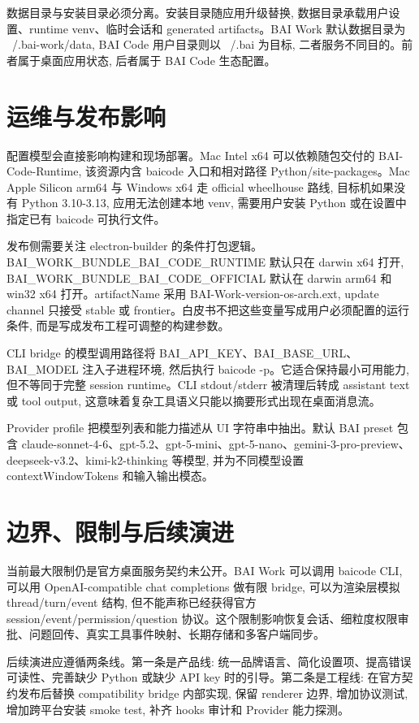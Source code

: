 数据目录与安装目录必须分离。安装目录随应用升级替换, 数据目录承载用户设置、runtime venv、临时会话和 generated artifacts。BAI Work 默认数据目录为 ~/.bai-work/data, BAI Code 用户目录则以 ~/.bai 为目标, 二者服务不同目的。前者属于桌面应用状态, 后者属于 BAI Code 生态配置。

\section{运维与发布影响}
配置模型会直接影响构建和现场部署。Mac Intel x64 可以依赖随包交付的 BAI-Code-Runtime, 该资源内含 baicode 入口和相对路径 Python/site-packages。Mac Apple Silicon arm64 与 Windows x64 走 official wheelhouse 路线, 目标机如果没有 Python 3.10-3.13, 应用无法创建本地 venv, 需要用户安装 Python 或在设置中指定已有 baicode 可执行文件。

发布侧需要关注 electron-builder 的条件打包逻辑。BAI\_WORK\_BUNDLE\_BAI\_CODE\_RUNTIME 默认只在 darwin x64 打开, BAI\_WORK\_BUNDLE\_BAI\_CODE\_OFFICIAL 默认在 darwin arm64 和 win32 x64 打开。artifactName 采用 BAI-Work-{version}-{os}-{arch}.{ext}, update channel 只接受 stable 或 frontier。白皮书不把这些变量写成用户必须配置的运行条件, 而是写成发布工程可调整的构建参数。

CLI bridge 的模型调用路径将 BAI\_API\_KEY、BAI\_BASE\_URL、BAI\_MODEL 注入子进程环境, 然后执行 baicode -p。它适合保持最小可用能力, 但不等同于完整 session runtime。CLI stdout/stderr 被清理后转成 assistant text 或 tool output, 这意味着复杂工具语义只能以摘要形式出现在桌面消息流。

Provider profile 把模型列表和能力描述从 UI 字符串中抽出。默认 BAI preset 包含 claude-sonnet-4-6、gpt-5.2、gpt-5-mini、gpt-5-nano、gemini-3-pro-preview、deepseek-v3.2、kimi-k2-thinking 等模型, 并为不同模型设置 contextWindowTokens 和输入输出模态。

\section{边界、限制与后续演进}
当前最大限制仍是官方桌面服务契约未公开。BAI Work 可以调用 baicode CLI, 可以用 OpenAI-compatible chat completions 做有限 bridge, 可以为渲染层模拟 thread/turn/event 结构, 但不能声称已经获得官方 session/event/permission/question 协议。这个限制影响恢复会话、细粒度权限审批、问题回传、真实工具事件映射、长期存储和多客户端同步。

后续演进应遵循两条线。第一条是产品线: 统一品牌语言、简化设置项、提高错误可读性、完善缺少 Python 或缺少 API key 时的引导。第二条是工程线: 在官方契约发布后替换 compatibility bridge 内部实现, 保留 renderer 边界, 增加协议测试, 增加跨平台安装 smoke test, 补齐 hooks 审计和 Provider 能力探测。

